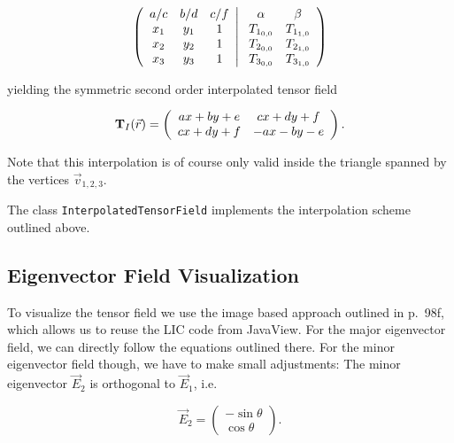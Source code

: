 \documentclass[a4paper,10pt,notitlepage]{scrartcl}
\newcommand{\mat}[1]{\mathbf{#1}}
\begin{document}
\begin{equation}
 \left ( \begin{array}{c c c}
          a/c & b/d & c/f \\
          x_1 & y_1 & 1 \\
          x_2 & y_2 & 1 \\
          x_3 & y_3 & 1
         \end{array}
         \right \rvert
 \left .
      \begin{array}{c c}
      \alpha & \beta \\
       T_{1_{0,0}} & T_{1_{1,0}} \\
       T_{2_{0,0}} & T_{2_{1,0}} \\
       T_{3_{0,0}} & T_{3_{1,0}}
      \end{array}
 \right )
\end{equation}

yielding the symmetric second order interpolated tensor field

\begin{equation}
 \mat{T}_I(\vec{r}) = \left(\begin{array}{c c}
                       ax + by + e & cx + dy + f \\
                       cx + dy + f & -ax -by -e
                      \end{array}\right).
 \label{eq:tf-linear}
\end{equation}

Note that this interpolation is of course only valid inside the triangle
spanned by the vertices $\vec{v}_{1,2,3}$.

The class \texttt{InterpolatedTensorField} implements the interpolation scheme
outlined above.

\subsection{Eigenvector Field Visualization}

To visualize the tensor field we use the image based approach outlined in
\cite{tfd} p.~98f, which allows us to reuse the LIC code from JavaView. For the
major eigenvector field, we can directly  follow the equations outlined
there. For the minor eigenvector field though, we have to make small
adjustments: The minor eigenvector $\vec{E}_2$ is orthogonal to
$\vec{E}_1$, i.e.

\begin{equation}
 \vec{E}_2 = \left( \begin{array}{c}
              -\sin \theta \\
              \cos \theta
             \end{array} \right).
\end{equation}
\end{document}
